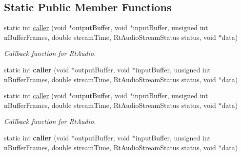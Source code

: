 \subsection*{Static Public Member Functions}
\begin{DoxyCompactItemize}
\item 
\hypertarget{classdispatch_a78e0b45ddb573d1b843ce02cd9092557}{static int \hyperlink{classdispatch_a78e0b45ddb573d1b843ce02cd9092557}{caller} (void $\ast$output\-Buffer, void $\ast$input\-Buffer, unsigned int n\-Buffer\-Frames, double stream\-Time, Rt\-Audio\-Stream\-Status status, void $\ast$data)}\label{classdispatch_a78e0b45ddb573d1b843ce02cd9092557}

\begin{DoxyCompactList}\small\item\em Callback function for Rt\-Audio. \end{DoxyCompactList}\item 
\hypertarget{classdispatch_a2bc93711c1aee895c430aece41ec026a}{static int {\bfseries caller} (void $\ast$output\-Buffer, void $\ast$input\-Buffer, unsigned int n\-Buffer\-Frames, double stream\-Time, Rt\-Audio\-Stream\-Status status, void $\ast$data)}\label{classdispatch_a2bc93711c1aee895c430aece41ec026a}

\item 
\hypertarget{classdispatch_a2bc93711c1aee895c430aece41ec026a}{static int \hyperlink{classdispatch_a2bc93711c1aee895c430aece41ec026a}{caller} (void $\ast$output\-Buffer, void $\ast$input\-Buffer, unsigned int n\-Buffer\-Frames, double stream\-Time, Rt\-Audio\-Stream\-Status status, void $\ast$data)}\label{classdispatch_a2bc93711c1aee895c430aece41ec026a}

\begin{DoxyCompactList}\small\item\em Callback function for Rt\-Audio. \end{DoxyCompactList}\item 
\hypertarget{classdispatch_a2bc93711c1aee895c430aece41ec026a}{static int {\bfseries caller} (void $\ast$output\-Buffer, void $\ast$input\-Buffer, unsigned int n\-Buffer\-Frames, double stream\-Time, Rt\-Audio\-Stream\-Status status, void $\ast$data)}\label{classdispatch_a2bc93711c1aee895c430aece41ec026a}

\end{DoxyCompactItemize}
